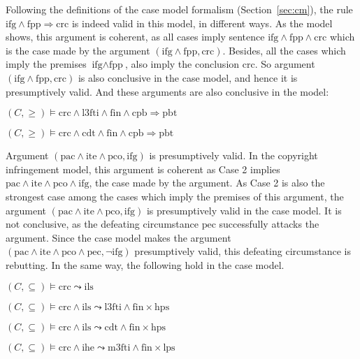 \documentclass{IOS-Book-Article}
\begin{document}
Following the definitions of the case model formalism (Section~\ref{sec:cm}), the rule $\textrm{ifg} \wedge \textrm{fpp} \Rightarrow \textrm{crc}$ is indeed valid in this model, in different ways. As the model shows, this argument is coherent, as all cases imply sentence $\textrm{ifg} \wedge \textrm{fpp} \wedge \textrm{crc}$ which is the case made by the argument $(\textrm{ifg} \wedge \textrm{fpp}, \textrm{crc})$. Besides, all the cases which imply the premises $\textrm{ifg} \wedge \textrm{fpp}$, also imply the conclusion $\textrm{crc}$. So argument $(\textrm{ifg} \wedge \textrm{fpp}, \textrm{crc})$ is also conclusive in the case model, and hence it is presumptively valid. And these arguments are also conclusive in the model:

\begin{description}
\item $(C,  \geq) \models \textrm{crc} \wedge \textrm{l3fti} \wedge \textrm{fin} \wedge \textrm{cpb} \Rightarrow \textrm{pbt}$
\item $(C,  \geq) \models \textrm{crc} \wedge \textrm{cdt} \wedge \textrm{fin} \wedge \textrm{cpb} \Rightarrow \textrm{pbt}$
\end{description}

\noindent Argument $(\textrm{pac} \wedge \textrm{ite} \wedge \textrm{pco}, \textrm{ifg})$ is presumptively valid. In the copyright infringement model, this argument is coherent as Case 2 implies $\textrm{pac} \wedge \textrm{ite} \wedge \textrm{pco} \wedge \textrm{ifg}$, the case made by the argument. As Case 2 is also the strongest case among the cases which imply the premises of this argument, the argument $(\textrm{pac} \wedge \textrm{ite} \wedge \textrm{pco}, \textrm{ifg})$ is presumptively valid in the case model. It is not conclusive, as the defeating circumstance $\textrm{pec}$ successfully attacks the argument. Since the case model makes the argument $(\textrm{pac} \wedge \textrm{ite} \wedge \textrm{pco} \wedge \textrm{pec}, \neg \textrm{ifg})$ presumptively valid, this defeating circumstance is rebutting. In the same way, the following hold in the case model.

\begin{description}
\item $(C,  \subseteq) \models \textrm{crc} \leadsto \textrm{ils}$
\item $(C,  \subseteq) \models \textrm{crc} \wedge \textrm{ils} \leadsto \textrm{l3fti} \wedge \textrm{fin} \times \textrm{hps}$
\item $(C,  \subseteq) \models \textrm{crc} \wedge \textrm{ils} \leadsto \textrm{cdt} \wedge \textrm{fin} \times \textrm{hps}$
\item $(C,  \subseteq) \models \textrm{crc} \wedge \textrm{ihe} \leadsto \textrm{m3fti} \wedge \textrm{fin} \times \textrm{lps}$
\end{description}
\end{document}
